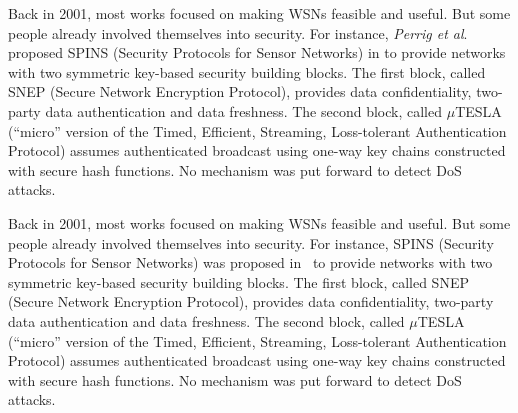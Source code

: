 Back in 2001, most works focused on making WSNs feasible and useful.
But some people already involved themselves into security.
For instance, \textit{Perrig et al}. proposed SPINS (Security Protocols for Sensor Networks) in
\cite{PSWCT02}
to provide networks with two symmetric key-based security building blocks.
The first block, called SNEP (Secure Network Encryption Protocol), provides data confidentiality, two-party data authentication and data freshness.
The second block, called $\mu$TESLA (``micro'' version of the Timed, Efficient, Streaming, Loss-tolerant Authentication Protocol) assumes authenticated broadcast using one-way key chains constructed with secure hash functions.
No mechanism was put forward to detect DoS attacks.


Back in 2001, most works focused on making WSNs feasible and useful.
But some people already involved themselves into security.
For instance, SPINS (Security Protocols for Sensor Networks) was proposed in~\cite{PSWCT02} to provide networks with two symmetric key-based security building blocks.
The first block, called SNEP (Secure Network Encryption Protocol), provides data confidentiality, two-party data authentication and data freshness.
The second block, called $\mu$TESLA (``micro'' version of the Timed, Efficient, Streaming, Loss-tolerant Authentication Protocol) assumes authenticated broadcast using one-way key chains constructed with secure hash functions.
No mechanism was put forward to detect DoS attacks.



